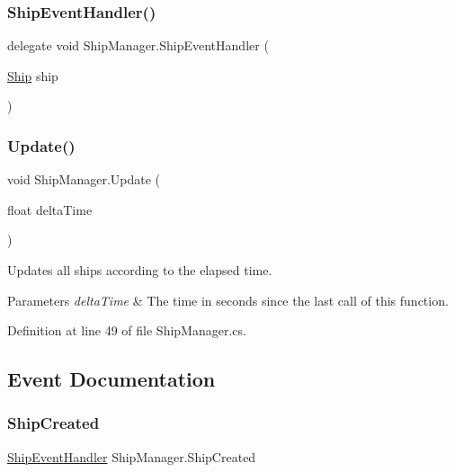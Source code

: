 \subsubsection{\texorpdfstring{Ship\+Event\+Handler()}{ShipEventHandler()}}
{\footnotesize\ttfamily delegate void Ship\+Manager.\+Ship\+Event\+Handler (\begin{DoxyParamCaption}\item[{\hyperlink{class_ship}{Ship}}]{ship }\end{DoxyParamCaption})}

\mbox{\label{class_ship_manager_a4f54aabd64ef5b7e366e9dcbcffb1151}} 
\subsubsection{\texorpdfstring{Update()}{Update()}}
{\footnotesize\ttfamily void Ship\+Manager.\+Update (\begin{DoxyParamCaption}\item[{float}]{delta\+Time }\end{DoxyParamCaption})}



Updates all ships according to the elapsed time. 


\begin{DoxyParams}{Parameters}
{\em delta\+Time} & The time in seconds since the last call of this function.\\
\hline
\end{DoxyParams}


Definition at line 49 of file Ship\+Manager.\+cs.



\subsection{Event Documentation}
\mbox{\label{class_ship_manager_ac4c4c3e36457dd80806ca4c08820852c}} 
\subsubsection{\texorpdfstring{Ship\+Created}{ShipCreated}}
{\footnotesize\ttfamily \hyperlink{class_ship_manager_a9dbbc387497ab2f4fc7c90cde65dfd4d}{Ship\+Event\+Handler} Ship\+Manager.\+Ship\+Created}



